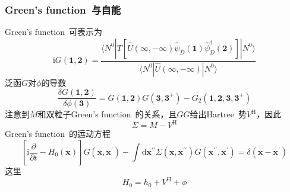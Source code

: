 \documentclass[cjk,slidestop,compress,mathserif,blue]{beamer}
\begin{document}
\frame
{
	\frametitle{\textrm{Green's function~}与自能}
	\textrm{Green's function~}可表示为
	\begin{displaymath}
		\mathrm{i}G(\mathbf{1},\mathbf{2})=\frac{\langle N^0|T[\hat{U}(\infty,-\infty)\hat{\psi}_D(\mathbf{1})\hat{\psi}_D^{\dag}(\mathbf{2})]|N^0\rangle}{\langle N^0|\hat{U}(\infty,-\infty)|N^0\rangle}
	\end{displaymath}
	泛函$G$对$\phi$的导数
	\begin{displaymath}
		\frac{\delta G(\mathbf{1},\mathbf{2})}{\delta\phi(\mathbf{3})}=G(\mathbf{1},\mathbf{2})G(\mathbf{3},\mathbf{3}^{+})-G_2(\mathbf{1},\mathbf{2},\mathbf{3},\mathbf{3}^{+})
	\end{displaymath}
	注意到$M$和双粒子\textrm{Green's function~}的关系，且$GG$给出\textrm{Hartree~}势$V^{\mathrm H}$，因此
	\begin{displaymath}
		\Sigma=M-V^{\mathrm H}
	\end{displaymath}
	\textrm{Green's function~}的运动方程
	\begin{displaymath}
		\left[ \mathrm{i}\frac{\partial}{\partial t}-H_0(\mathbf{x}) \right]G(\mathbf{x},\mathbf{x}^{\prime})-\int\mathrm{d}\mathbf{x}^{\prime\prime}\Sigma(\mathbf{x},\mathbf{x}^{\prime\prime})G(\mathbf{x}^{\prime\prime},\mathbf{x}^{\prime})=\delta(\mathbf{x}-\mathbf{x}^{\prime})
	\end{displaymath}
	这里
	\begin{displaymath}
		H_0=h_0+V^{\mathrm H}+\phi
	\end{displaymath}
}
\end{document}
